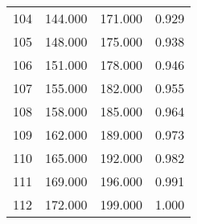 \begin{tabular}{cccc}
  104 & 144.000 & 171.000 & 0.929 \\ 
  105 & 148.000 & 175.000 & 0.938 \\ 
  106 & 151.000 & 178.000 & 0.946 \\ 
  107 & 155.000 & 182.000 & 0.955 \\ 
  108 & 158.000 & 185.000 & 0.964 \\ 
  109 & 162.000 & 189.000 & 0.973 \\ 
  110 & 165.000 & 192.000 & 0.982 \\ 
  111 & 169.000 & 196.000 & 0.991 \\ 
  112 & 172.000 & 199.000 & 1.000 \\ 
   \hline
\end{tabular}
